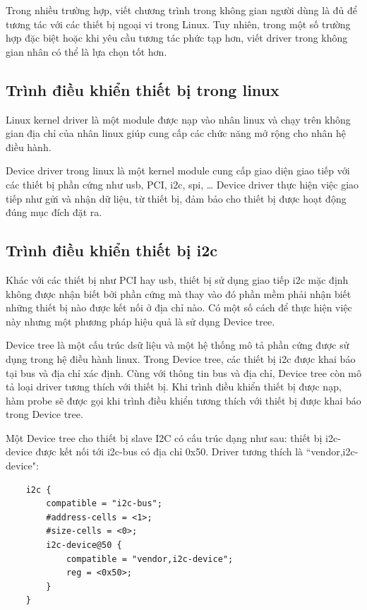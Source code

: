 \documentclass{report}
\begin{document}
Trong nhiều trường hợp, viết chương trình trong không gian người dùng là đủ để tương tác với các thiết bị ngoại vi trong Linux. Tuy nhiên, trong một số trường hợp đặc biệt hoặc khi yêu cầu tương tác phức tạp hơn, viết driver trong không gian nhân có thể là lựa chọn tốt hơn.

\subsection{Trình điều khiển thiết bị trong linux}

Linux kernel driver là một module được nạp vào nhân linux và chạy trên không gian địa chỉ của nhân linux giúp cung cấp các chức năng mở rộng cho nhân hệ điều hành.

Device driver trong linux là một kernel module cung cấp giao diện giao tiếp với các thiết bị phần cứng như \acrshort{usb}, PCI, \acrshort{i2c}, \acrshort{spi}, … Device driver thực hiện việc giao tiếp như gửi và nhận dữ liệu, từ thiết bị, đảm bảo cho thiết bị được hoạt động đúng mục đích đặt ra. \cite{tutorial}

 \subsection{Trình điều khiển thiết bị \acrshort{i2c}}

	Khác với các thiết bị như PCI hay \acrshort{usb}, thiết bị sử dụng giao tiếp \acrshort{i2c} mặc định không được nhận biết bởi phần cứng mà thay vào đó phần mềm phải nhận biết những thiết bị nào được kết nối ở địa chỉ nào. Có một số cách để thực hiện việc này nhưng một phương pháp hiệu quả là sử dụng Device tree. \cite{i2c-instance}

Device tree là một cấu trúc dsữ liệu và một hệ thống mô tả phần cứng được sử dụng trong hệ điều hành linux. Trong Device tree, các thiết bị \acrshort{i2c} được khai báo tại bus và địa chỉ xác định. Cùng với thông tin bus và địa chỉ, Device tree còn mô tả loại driver tương thích với thiết bị. Khi trình điều khiển thiết bị được nạp, hàm probe sẽ được gọi khi trình điều khiển tương thích với thiết bị được khai báo trong Device tree.

Một Device tree cho thiết bị slave I2C có cấu trúc dạng như sau: thiết bị i2c-device được kết nối tới i2c-bus có địa chỉ 0x50. Driver tương thích là “vendor,i2c-device":
\begin{lstlisting}
	i2c {
		compatible = "i2c-bus";
		#address-cells = <1>;
		#size-cells = <0>;
		i2c-device@50 {
			compatible = "vendor,i2c-device";
			reg = <0x50>;
		}
	}
\end{lstlisting}
\end{document}
